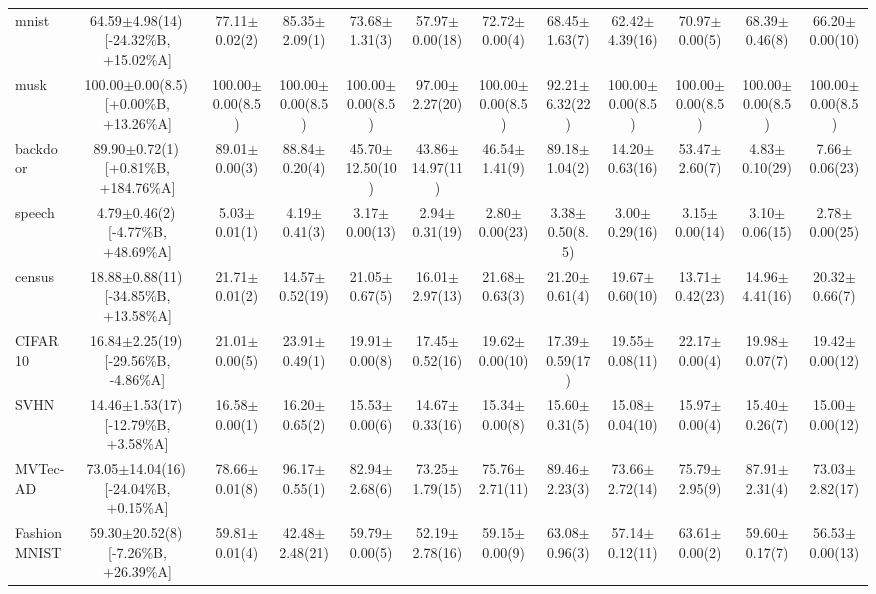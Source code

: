 \documentclass[conference]{IEEEtran}
\begin{document}
\begin{table}
{\begin{tabular}{lccccccccccc}
				mnist & 64.59$\pm$4.98(14)\,[{-}24.32\%B, {+}15.02\%A] & 77.11$\pm$0.02(2) & 85.35$\pm$2.09(1) & 73.68$\pm$1.31(3) & 57.97$\pm$0.00(18) & 72.72$\pm$0.00(4) & 68.45$\pm$1.63(7) & 62.42$\pm$4.39(16) & 70.97$\pm$0.00(5) & 68.39$\pm$0.46(8) & 66.20$\pm$0.00(10) \\
				musk & 100.00$\pm$0.00(8.5)\,[{+}0.00\%B, {+}13.26\%A] & 100.00$\pm$0.00(8.5) & 100.00$\pm$0.00(8.5) & 100.00$\pm$0.00(8.5) & 97.00$\pm$2.27(20) & 100.00$\pm$0.00(8.5) & 92.21$\pm$6.32(22) & 100.00$\pm$0.00(8.5) & 100.00$\pm$0.00(8.5) & 100.00$\pm$0.00(8.5) & 100.00$\pm$0.00(8.5) \\
				backdoor & 89.90$\pm$0.72(1)\,[{+}0.81\%B, {+}184.76\%A] & 89.01$\pm$0.00(3) & 88.84$\pm$0.20(4) & 45.70$\pm$12.50(10) & 43.86$\pm$14.97(11) & 46.54$\pm$1.41(9) & 89.18$\pm$1.04(2) & 14.20$\pm$0.63(16) & 53.47$\pm$2.60(7) & 4.83$\pm$0.10(29) & 7.66$\pm$0.06(23) \\
				speech & 4.79$\pm$0.46(2)\,[{-}4.77\%B, {+}48.69\%A] & 5.03$\pm$0.01(1) & 4.19$\pm$0.41(3) & 3.17$\pm$0.00(13) & 2.94$\pm$0.31(19) & 2.80$\pm$0.00(23) & 3.38$\pm$0.50(8.5) & 3.00$\pm$0.29(16) & 3.15$\pm$0.00(14) & 3.10$\pm$0.06(15) & 2.78$\pm$0.00(25) \\
				census & 18.88$\pm$0.88(11)\,[{-}34.85\%B, {+}13.58\%A] & 21.71$\pm$0.01(2) & 14.57$\pm$0.52(19) & 21.05$\pm$0.67(5) & 16.01$\pm$2.97(13) & 21.68$\pm$0.63(3) & 21.20$\pm$0.61(4) & 19.67$\pm$0.60(10) & 13.71$\pm$0.42(23) & 14.96$\pm$4.41(16) & 20.32$\pm$0.66(7) \\
				CIFAR10 & 16.84$\pm$2.25(19)\,[{-}29.56\%B, {-}4.86\%A] & 21.01$\pm$0.00(5) & 23.91$\pm$0.49(1) & 19.91$\pm$0.00(8) & 17.45$\pm$0.52(16) & 19.62$\pm$0.00(10) & 17.39$\pm$0.59(17) & 19.55$\pm$0.08(11) & 22.17$\pm$0.00(4) & 19.98$\pm$0.07(7) & 19.42$\pm$0.00(12) \\
				SVHN & 14.46$\pm$1.53(17)\,[{-}12.79\%B, {+}3.58\%A] & 16.58$\pm$0.00(1) & 16.20$\pm$0.65(2) & 15.53$\pm$0.00(6) & 14.67$\pm$0.33(16) & 15.34$\pm$0.00(8) & 15.60$\pm$0.31(5) & 15.08$\pm$0.04(10) & 15.97$\pm$0.00(4) & 15.40$\pm$0.26(7) & 15.00$\pm$0.00(12) \\
				MVTec-AD & 73.05$\pm$14.04(16)\,[{-}24.04\%B, {+}0.15\%A] & 78.66$\pm$0.01(8) & 96.17$\pm$0.55(1) & 82.94$\pm$2.68(6) & 73.25$\pm$1.79(15) & 75.76$\pm$2.71(11) & 89.46$\pm$2.23(3) & 73.66$\pm$2.72(14) & 75.79$\pm$2.95(9) & 87.91$\pm$2.31(4) & 73.03$\pm$2.82(17) \\
				FashionMNIST & 59.30$\pm$20.52(8)\,[{-}7.26\%B, {+}26.39\%A] & 59.81$\pm$0.01(4) & 42.48$\pm$2.48(21) & 59.79$\pm$0.00(5) & 52.19$\pm$2.78(16) & 59.15$\pm$0.00(9) & 63.08$\pm$0.96(3) & 57.14$\pm$0.12(11) & 63.61$\pm$0.00(2) & 59.60$\pm$0.17(7) & 56.53$\pm$0.00(13) \\

\end{tabular}}
\end{table}
\end{document}
